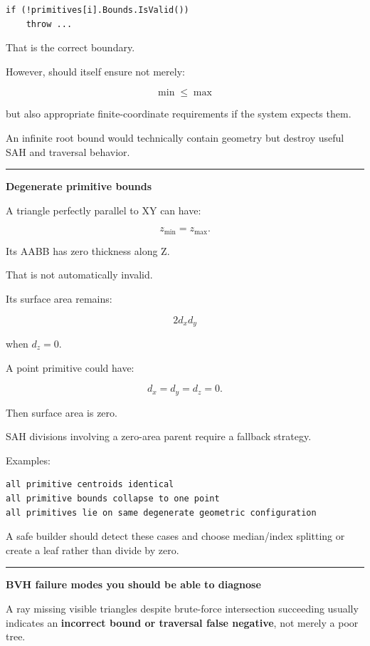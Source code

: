 \begin{verbatim}
if (!primitives[i].Bounds.IsValid())
    throw ...
\end{verbatim}

That is the correct boundary.

However,  should itself ensure not merely:

\[
\min\le\max
\]

but also appropriate finite-coordinate requirements if the system expects them.

An infinite root bound would technically contain geometry but destroy useful SAH and traversal behavior.

\begin{center}\rule{0.5\linewidth}{0.5pt}\end{center}

\textbf{Degenerate primitive bounds}

A triangle perfectly parallel to XY can have:

\[
z_{\min}=z_{\max}.
\]

Its AABB has zero thickness along Z.

That is not automatically invalid.

Its surface area remains:

\[
2d_xd_y
\]

when \(d_z=0\).

A point primitive could have:

\[
d_x=d_y=d_z=0.
\]

Then surface area is zero.

SAH divisions involving a zero-area parent require a fallback strategy.

Examples:

\begin{verbatim}
all primitive centroids identical
all primitive bounds collapse to one point
all primitives lie on same degenerate geometric configuration
\end{verbatim}

A safe builder should detect these cases and choose median/index splitting or create a leaf rather than divide by zero.

\begin{center}\rule{0.5\linewidth}{0.5pt}\end{center}

\textbf{BVH failure modes you should be able to diagnose}

A ray missing visible triangles despite brute-force intersection succeeding usually indicates an \textbf{incorrect bound or traversal false negative}, not merely a poor tree.

